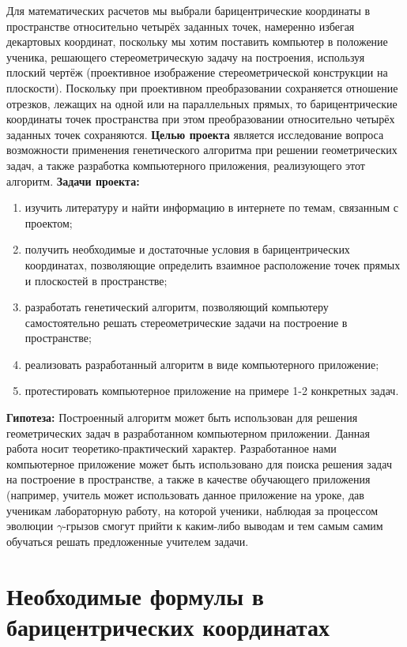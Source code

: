 \documentclass[a4paper,12pt]{article}
\theoremstyle{plain} %
\numberwithin{equation}{section}
\theoremstyle{definition} %
\theoremstyle{remark} %
\begin{document}
Для математических расчетов мы выбрали барицентрические координаты в пространстве относительно четырёх заданных точек, намеренно избегая декартовых координат, поскольку мы хотим поставить компьютер в положение ученика, решающего стереометрическую задачу на построения, используя плоский чертёж (проективное изображение стереометрической конструкции на плоскости). Поскольку при проективном преобразовании сохраняется отношение отрезков, лежащих на одной или на параллельных прямых, то барицентрические координаты точек пространства при этом преобразовании относительно четырёх заданных точек сохраняются.
\textbf{Целью проекта} является исследование вопроса возможности применения генетического алгоритма при решении геометрических задач, а также разработка компьютерного приложения, реализующего этот алгоритм.
\textbf{Задачи проекта:}
\begin{enumerate}
    \item изучить литературу и найти информацию в интернете по темам, связанным с проектом;
	\item получить необходимые и достаточные условия в барицентрических координатах, позволяющие	определить	взаимное расположение точек прямых и плоскостей в пространстве;
	\item разработать генетический алгоритм, позволяющий компьютеру самостоятельно решать стереометрические задачи на построение в пространстве;
	\item реализовать разработанный алгоритм в виде компьютерного приложение;
	\item протестировать компьютерное приложение на примере 1-2 конкретных задач.
\end{enumerate}
\textbf{Гипотеза:} Построенный алгоритм может быть использован для решения геометрических задач в разработанном компьютерном приложении.
Данная работа носит теоретико-практический характер. Разработанное нами компьютерное приложение может быть использовано для поиска решения  задач на построение в пространстве, а также в качестве обучающего приложения (например, учитель может использовать данное приложение на уроке, дав ученикам лабораторную работу, на которой ученики,  наблюдая за процессом эволюции $\gamma$-грызов смогут прийти к каким-либо выводам и  тем самым самим обучаться решать предложенные учителем задачи.
\newpage
\section{Необходимые формулы в барицентрических координатах}
\end{document}
